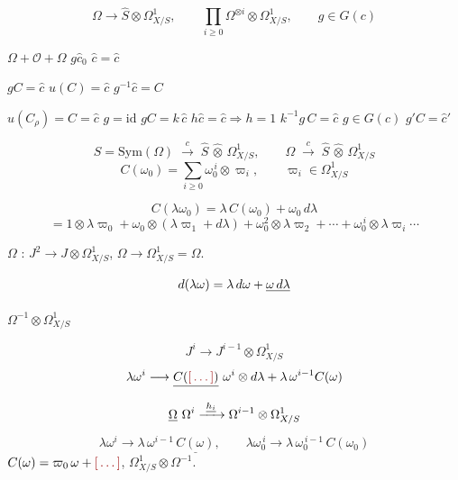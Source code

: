 \documentclass[11pt,a4paper]{article}
\begin{document}

\[
  \Omega \longrightarrow \widehat{S} \otimes \Omega^1_{X/S},
  \qquad
  \prod_{i \geqslant 0} \Omega^{\otimes i} \otimes \Omega^1_{X/S},
  \qquad g \in G(c)
\]

$\Omega + \mathcal{O} + \Omega$ \quad $g\hat{c}_0$ \quad $\hat{c} = \hat{c}$

 \quad $gC = \hat{c}$ \quad $u(C) = \hat{c}$ \quad
{} \quad {} \quad
$g^{-1}\hat{c} = C$

 \quad $u(C_\rho) = C = \hat{c}$ \quad
$g = \mathrm{id}$ \quad {} \quad $gC = k\,\hat{c}$ \quad
$h\hat{c} = \hat{c} \Rightarrow h = 1$ \quad $k^{-1}g\,C = \hat{c}$ \quad
$g \in G(c)$ \quad $g'C = \hat{c}'$


\[
  S = \mathrm{Sym}(\Omega) \;\xrightarrow{\ c\ }\; \widehat{S} \,\widehat{\otimes}\, \Omega^1_{X/S},
  \qquad
  \Omega \;\xrightarrow{\ c\ }\; \widehat{S} \,\widehat{\otimes}\, \Omega^1_{X/S}
\]
\[
  C(\omega_0) = \sum_{i \geqslant 0} \omega_0^{\,i} \otimes \varpi_i,
  \qquad \varpi_i \in \Omega^1_{X/S}
\]

\[
  C(\lambda\omega_0) = \lambda\,C(\omega_0) + \omega_0\,d\lambda
\]
\[
  = 1 \otimes \lambda\varpi_0 + \omega_0 \otimes (\lambda\varpi_1 + d\lambda)
  + \omega_0^2 \otimes \lambda\varpi_2 + \cdots + \omega_0^{\,i} \otimes \lambda\varpi_i \cdots
\]

$\Omega$ : $J^2 \longrightarrow J \otimes \Omega^1_{X/S}$, \quad
$\Omega \longrightarrow \Omega^1_{X/S} = \Omega$.

\[
  d(\lambda\omega) = \lambda\,d\omega + \struck{\omega\,d\lambda}
\]

$\Omega^{-1} \otimes \Omega^1_{X/S}$

\[
  J^i \longrightarrow J^{i-1} \otimes \Omega^1_{X/S}
\]
\[
  \lambda\omega^i \longrightarrow \struck{C(\ill{})}\ \omega^i \otimes d\lambda
  + \lambda\,\omega^{i-1} C(\omega)
\]
\[
  \struck{\Omega}\ \Omega^i \xrightarrow{\ \uncertain{h_i}\ } \Omega^{i-1} \otimes \Omega^1_{X/S}
\]
\[
  \lambda\omega^i \longrightarrow \lambda\,\omega^{i-1}\,\underline{C(\omega)},
  \qquad
  \lambda\omega_0^{\,i} \longrightarrow \lambda\,\omega_0^{\,i-1}\,C(\omega_0)
\]
$C(\omega) = \varpi_0\,\omega + \ill{}$, \quad $\Omega^1_{X/S} \otimes \Omega^{-1}$.
\end{document}
